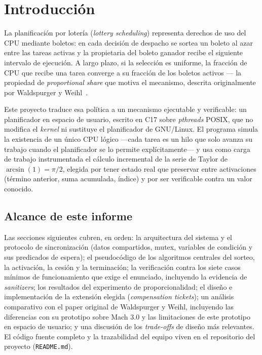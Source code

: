 \section{Introducción}

La planificación por lotería (\textit{lottery scheduling}) representa
derechos de uso del CPU mediante boletos: en cada decisión de despacho se
sortea un boleto al azar entre las tareas activas y la propietaria del
boleto ganador recibe el siguiente intervalo de ejecución. A largo plazo, si
la selección es uniforme, la fracción de CPU que recibe una tarea converge a
su fracción de los boletos activos --- la propiedad de \textit{proportional
share} que motiva el mecanismo, descrita originalmente por Waldspurger y
Weihl~\cite{Waldspurger1994}.

Este proyecto traduce esa política a un mecanismo ejecutable y verificable:
un planificador en espacio de usuario, escrito en C17 sobre \textit{pthreads}
POSIX, que no modifica el \textit{kernel} ni sustituye el planificador de
GNU/Linux. El programa simula la existencia de un único CPU lógico ---cada
tarea es un hilo que solo avanza su trabajo cuando el planificador se lo
permite explícitamente--- y usa como carga de trabajo instrumentada el
cálculo incremental de la serie de Taylor de $\arcsin(1) = \pi/2$, elegida
por tener estado real que preservar entre activaciones (término anterior,
suma acumulada, índice) y por ser verificable contra un valor conocido.

\subsection{Alcance de este informe}

Las secciones siguientes cubren, en orden: la arquitectura del sistema y el
protocolo de sincronización (datos compartidos, mutex, variables de
condición y sus predicados de espera); el pseudocódigo de los algoritmos
centrales del sorteo, la activación, la cesión y la terminación; la
verificación contra los siete casos mínimos de funcionamiento que exige el
enunciado, incluyendo la evidencia de \textit{sanitizers}; los resultados del
experimento de proporcionalidad; el diseño e implementación de la extensión
elegida (\textit{compensation tickets}); un análisis comparativo con el paper
original de Waldspurger y Weihl, incluyendo las diferencias con su prototipo
sobre Mach 3.0 y las limitaciones de este prototipo en espacio de usuario; y
una discusión de los \textit{trade-offs} de diseño más relevantes. El código
fuente completo y la trazabilidad del equipo viven en el repositorio del
proyecto (\texttt{README.md}).
